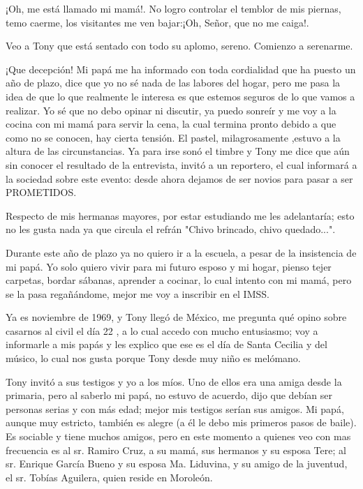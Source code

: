 \documentclass[letterpaper, 12pt]{book}
\begin{document}
¡Oh, me está llamado mi mamá!. No logro controlar el temblor de mis piernas, temo caerme, los visitantes me ven bajar:¡Oh, Señor, que no me caiga!.

Veo a Tony que está sentado con todo su aplomo, sereno. Comienzo a serenarme.

¡Que decepción! Mi papá me ha informado con toda cordialidad que ha puesto un año de plazo, dice que yo no sé nada de las labores del hogar, pero me pasa la idea de que lo que realmente le interesa es que estemos seguros de lo que vamos a realizar. Yo sé que no debo opinar ni discutir, ya puedo sonreír y me voy a la cocina con mi mamá para servir la cena, la cual termina pronto debido a que como no se conocen, hay cierta tensión. El pastel, milagrosamente ,estuvo a la altura de las circunstancias. Ya para irse sonó el timbre y Tony me dice que aún sin conocer el resultado de la entrevista, invitó a un reportero, el cual informará a la sociedad sobre este evento: desde ahora dejamos de ser novios para pasar a ser PROMETIDOS.

Respecto de mis hermanas mayores, por estar estudiando me les adelantaría; esto no les gusta nada ya que circula el refrán "Chivo brincado, chivo quedado...".

Durante este año de plazo ya no quiero ir a la escuela, a pesar de la insistencia de mi papá. Yo solo quiero vivir para mi futuro esposo y mi hogar, pienso tejer carpetas, bordar sábanas, aprender a cocinar, lo cual intento con mi mamá, pero se la pasa regañándome, mejor me voy a inscribir en el IMSS.

Ya es noviembre de 1969, y Tony llegó de México, me pregunta qué opino sobre casarnos al civil el día 22 , a lo cual accedo con mucho entusiasmo; voy a informarle a mis papás y les explico que ese es el día de Santa Cecilia y del músico, lo cual nos gusta porque Tony desde muy niño es melómano.

Tony invitó a sus testigos y yo a los míos. Uno de ellos era una amiga desde la primaria, pero al saberlo mi papá, no estuvo de acuerdo, dijo que debían ser personas serias y con más edad; mejor mis testigos serían sus amigos. Mi papá, aunque muy estricto, también es alegre (a él le debo mis primeros pasos de baile). Es sociable y tiene muchos amigos, pero en este momento a quienes veo con mas frecuencia es al sr. Ramiro Cruz, a su mamá, sus hermanos y su esposa Tere; al sr. Enrique García Bueno y su esposa Ma. Liduvina, y su amigo de la juventud, el sr. Tobías Aguilera, quien reside en Moroleón.
\end{document}
